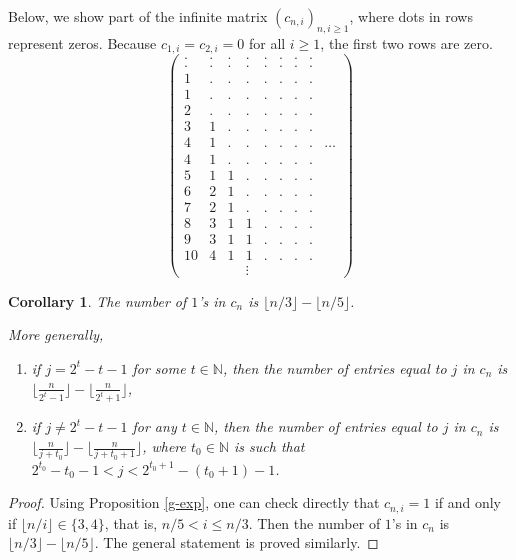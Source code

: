 \documentclass[reqno]{amsart}
\newtheorem{corollary}[theorem]{Corollary}
\theoremstyle{definition}
\begin{document}
Below,  we show part of the infinite matrix $(c_{n,i})_{n,i\geq 1}$, where dots in rows represent zeros. Because $c_{1,i}=c_{2,i}=0$ for all $i\geq 1$, the first two rows are zero.
$$\begin{pmatrix} 
 . & . & . & . & . & . & . & .  \\ 
 . & . & . & . & . & . & . & .  \\ 
 1 & . & . & . & . & . & . & .  \\ 
 1 & . & . & . & . & . & . & .  \\ 
 2 & . & . & . & . & . & . & .  \\ 
 3 & 1 & . & . & . & . & . & .  \\  
 4 & 1 & . & . & . & . & . & . & \ldots \\ 
 4 & 1 & . & . & . & . & . & .  \\ 
 5 & 1 & 1 & . & . & . & . & .  \\ 
 6 & 2 & 1 & . & . & . & . & .  \\ 
 7 & 2 & 1 & . & . & . & . & .  \\ 
 8 & 3 & 1 & 1 & . & . & . & .  \\ 
 9 & 3 & 1 & 1 & . & . & . & .  \\ 
10 & 4 & 1 & 1 & . & . & . & .  \\
   &   &   & \vdots 
\end{pmatrix}$$


\begin{corollary}
The number of $1$'s in $c_n$ is    $\lfloor n/3\rfloor - \lfloor n/5\rfloor$. 

More generally,
\begin{enumerate}[label=(\alph*)]
    \item if $j= 2^t-t-1$ for some $t\in \mathbb N$, then the  number of entries equal to $j$ in $c_n$ is $\lfloor \frac{n}{2^t-1}\rfloor-\lfloor \frac{n}{2^t+1}\rfloor$,
    \item if $j\neq 2^t-t-1$ for any $t\in \mathbb N$, then the  number of entries equal to $j$ in $c_n$ is $\lfloor \frac{n}{j+t_0}\rfloor-\lfloor \frac{n}{j+t_0+1}\rfloor$, where $t_0\in \mathbb N$ is such that $2^{t_0}-t_0-1<j<2^{t_0+1}-(t_0+1)-1$.
\end{enumerate}
\end{corollary}
\begin{proof}  Using Proposition \ref{g-exp}, one can check directly that $c_{n,i}=1$ if and only if $\lfloor n/i\rfloor\in\{3,4\}$, that is,  $n/5<i\leq n/3$. Then the number of $1$'s in $c_n$ is $\lfloor n/3\rfloor - \lfloor n/5\rfloor$. 
The general statement is proved similarly.
\end{proof}
\end{document}
